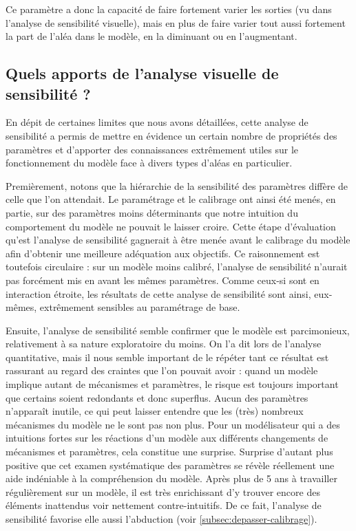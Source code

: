 Ce paramètre a donc la capacité de faire fortement varier les sorties (vu dans l'analyse de sensibilité visuelle), mais en plus de faire varier tout aussi fortement la part de l'aléa dans le modèle, en la diminuant ou en l'augmentant.

\subsection{Quels apports de l'analyse visuelle de sensibilité ?\label{subsec:apports-analyse-visuelle-sensib}}

En dépit de certaines limites que nous avons détaillées, cette analyse de sensibilité a permis de mettre en évidence un certain nombre de propriétés des paramètres et d'apporter des connaissances extrêmement utiles sur le fonctionnement du modèle face à divers types d'aléas en particulier.

Premièrement, notons que la hiérarchie de la sensibilité des paramètres diffère de celle que l'on attendait.
Le paramétrage et le calibrage ont ainsi été menés, en partie, sur des paramètres moins déterminants que notre intuition du comportement du modèle ne pouvait le laisser croire.
Cette étape d'évaluation qu'est l'analyse de sensibilité gagnerait à être menée avant le calibrage du modèle afin d'obtenir une meilleure adéquation aux objectifs.
Ce raisonnement est toutefois circulaire : sur un modèle moins calibré, l'analyse de sensibilité n'aurait pas forcément mis en avant les mêmes paramètres.
Comme ceux-si sont en interaction étroite, les résultats de cette analyse de sensibilité sont ainsi, eux-mêmes, extrêmement sensibles au paramétrage de base.

Ensuite, l'analyse de sensibilité semble confirmer que le modèle est parcimonieux, relativement à sa nature exploratoire du moins.
On l'a dit lors de l'analyse quantitative, mais il nous semble important de le répéter tant ce résultat est rassurant au regard des craintes que l'on pouvait avoir : quand un modèle implique autant de mécanismes et paramètres, le risque est toujours important que certains soient redondants et donc superflus.
Aucun des paramètres n'apparaît inutile, ce qui peut laisser entendre que les (très) nombreux mécanismes du modèle ne le sont pas non plus.
Pour un modélisateur qui a des intuitions fortes sur les réactions d'un modèle aux différents changements de mécanismes et paramètres, cela constitue une surprise.
Surprise d'autant plus positive que cet examen systématique des paramètres se révèle réellement une aide indéniable à la compréhension du modèle.
Après plus de 5 ans à travailler régulièrement sur un modèle, il est très enrichissant d'y trouver encore des éléments inattendus voir nettement contre-intuitifs.
De ce fait, l'analyse de sensibilité favorise elle aussi l'abduction (voir \cref{subsec:depasser-calibrage}).

